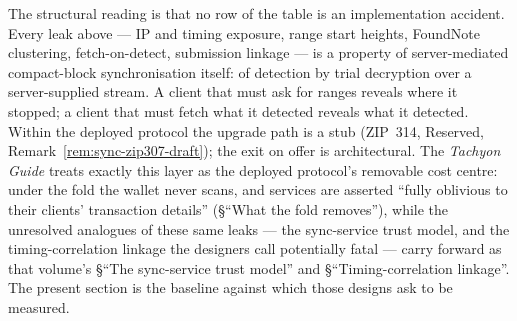 \documentclass[11pt,a4paper]{article}
\theoremstyle{definition}
\begin{document}
The structural reading is that no row of the table is an implementation
accident. Every leak above --- IP and timing exposure, range start heights,
\textsf{FoundNote} clustering, fetch-on-detect, submission linkage --- is a
property of server-mediated compact-block synchronisation itself: of
detection by trial decryption over a server-supplied stream. A client that
must ask for ranges reveals where it stopped; a client that must fetch what
it detected reveals what it detected. Within the deployed protocol the
upgrade path is a stub (ZIP~314, Reserved,
Remark~\ref{rem:sync-zip307-draft}); the exit on offer is architectural.
The \emph{Tachyon Guide} treats exactly this layer as the deployed
protocol's removable cost centre: under the fold the wallet never scans,
and services are asserted ``fully oblivious to their clients' transaction
details'' (\S``What the fold removes''), while the unresolved analogues of
these same leaks --- the sync-service trust model, and the
timing-correlation linkage the designers call potentially fatal --- carry
forward as that volume's \S``The sync-service trust model'' and
\S``Timing-correlation linkage''. The present section is the baseline
against which those designs ask to be measured.
\end{document}
